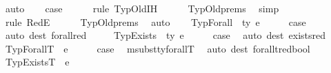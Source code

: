 \begin{isabellebody}
\ auto\isanewline
\ \ \isamarkupfalse%
\ {\isacharquery}{\kern0pt}case\isanewline
\ \ \ \ \isamarkupfalse%
\ {\isacharparenleft}{\kern0pt}rule\ TypOld{\isachardot}{\kern0pt}IH{\isacharparenleft}{\kern0pt}{}{\isacharparenright}{\kern0pt}{\isacharparenright}{\kern0pt}\isanewline
\ \ \ \ \isamarkupfalse%
\ TypOld{\isachardot}{\kern0pt}prems\ \isamarkupfalse%
\ simp\isanewline
\ \ \ \ \ \ \ \ \ \ \isamarkupfalse%
\ {\isacharparenleft}{\kern0pt}rule\ RedE{\isacharparenright}{\kern0pt}\isanewline
\ \ \ \ \isamarkupfalse%
\ TypOld{\isachardot}{\kern0pt}prems\ \isamarkupfalse%
\ auto\isanewline
{}\isamarkupfalse%
\isanewline
\ \ \isamarkupfalse%
\ {\isacharparenleft}{\kern0pt}TypForall\ {\isasymDelta}\ ty\ e{\isacharparenright}{\kern0pt}\isanewline
\ \ \isamarkupfalse%
\ \isamarkupfalse%
\ {\isacharquery}{\kern0pt}case\ \isamarkupfalse%
\ {\isacharparenleft}{\kern0pt}auto\ dest{\isacharcolon}{\kern0pt}\ forall{\isacharunderscore}{\kern0pt}red{\isacharparenright}{\kern0pt}\ \ \ \ \isanewline
{}\isamarkupfalse%
\isanewline
{}\isamarkupfalse%
\ {\isacharparenleft}{\kern0pt}TypExists\ {\isasymDelta}\ ty\ e{\isacharparenright}{\kern0pt}\isanewline
\ \ \isamarkupfalse%
\ \isamarkupfalse%
\ {\isacharquery}{\kern0pt}case\ \isamarkupfalse%
\ {\isacharparenleft}{\kern0pt}auto\ dest{\isacharcolon}{\kern0pt}\ exists{\isacharunderscore}{\kern0pt}red{\isacharparenright}{\kern0pt}\isanewline
{}\isamarkupfalse%
\isanewline
\ \ \isamarkupfalse%
\ {\isacharparenleft}{\kern0pt}TypForallT\ {\isasymDelta}\ e{\isacharparenright}{\kern0pt}\isanewline
\ \ \isamarkupfalse%
\ \isamarkupfalse%
\ {\isacharquery}{\kern0pt}case\ \isamarkupfalse%
\ msubst{\isacharunderscore}{\kern0pt}ty{\isacharunderscore}{\kern0pt}forallT\ \isamarkupfalse%
\ {\isacharparenleft}{\kern0pt}auto\ dest{\isacharcolon}{\kern0pt}\ forallt{\isacharunderscore}{\kern0pt}red{\isacharunderscore}{\kern0pt}bool{\isacharparenright}{\kern0pt}\isanewline
{}\isamarkupfalse%
\isanewline
\ \ \isamarkupfalse%
\ {\isacharparenleft}{\kern0pt}TypExistsT\ {\isasymDelta}\ e{\isacharparenright}{\kern0pt}\isanewline
\ \ \isamarkupfalse%

\end{isabellebody}
